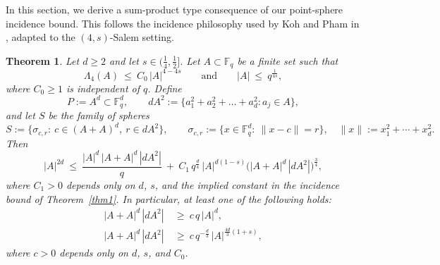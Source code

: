 \documentclass{article}
\newtheorem{theorem}{Theorem}[section]
\begin{document}
In this section, we derive a sum-product type consequence of our point-sphere incidence bound.
This follows the incidence philosophy used by Koh and Pham in \cite{Kohpham}, adapted to the
$(4,s)$-Salem setting.


\begin{theorem}
\label{thm:sum-product-salem}
Let $d\ge 2$ and let $s\in\big(\frac{1}{4}, \frac{1}{2} \big]$.
Let $A\subset \mathbb F_q$ be a finite set such that
\begin{equation}\label{eq:SP-energy-A}
\Lambda_4(A)\ \le\ C_0\,|A|^{4-4s}
\qquad\text{and}\qquad
|A|\ \le\ q^{\frac{1}{4s}},
\end{equation}
where $C_0\ge 1$ is independent of $q$.
Define
\[
P:=A^d\subset \mathbb F_q^d,
\qquad
dA^2:=\{a_1^2+a_2^2+\dots+a_d^2:a_j\in A\},
\]
and let $S$ be the family of spheres
\[
S:=\{\sigma_{c,r}:\ c\in (A+A)^d,\ r\in dA^2\},
\qquad
\sigma_{c,r}:=\{x\in\mathbb F_q^d:\ \|x-c\|=r\},
\quad
\|x\|:=x_1^2+\cdots+x_d^2.
\]
Then
\begin{equation}\label{eq:SP-master}
|A|^{2d}
\ \le\
\frac{|A|^d\,|A+A|^d\,|dA^2|}{q}
\ +\
C_1\,q^{\frac{d}{4}}\,|A|^{d(1-s)}\bigl(|A+A|^d\,|dA^2|\bigr)^{\frac{3}{4}},
\end{equation}
where $C_1>0$ depends only on $d$, $s$, and the implied constant in the incidence bound of
Theorem~\ref{thm1}.
In particular, at least one of the following holds:
\begin{align}
|A+A|^d\,|dA^2| &\ \ge\ c\,q\,|A|^d, \label{eq:SP-case1}\\
|A+A|^d\,|dA^2| &\ \ge\ c\,q^{-\frac{d}{3}}\,|A|^{\frac{4d}{3}(1+s)}, \label{eq:SP-case2}
\end{align}
where $c>0$ depends only on $d$, $s$, and $C_0$.
\end{theorem}
\end{document}
